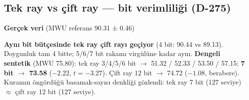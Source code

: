 \documentclass[11pt]{article}
\begin{document}
\subsection*{Tek ray vs çift ray — bit verimliliği (D-275)}
\textbf{Gerçek veri} (MWU referans 90.31 ± 0.46)
\begin{center}\small{}\end{center}
\textbf{Aynı bit bütçesinde tek ray çift rayı geçiyor} (4 bit: 90.44 vs 89.13). Doygunluk tam 4 bitte; 5/6/7 bit rakamı virgülüne kadar aynı.
\textbf{Dengeli sentetik} (MWU 75.80): tek ray 3/4/5/6 bit $\rightarrow$ 51.32 / 52.33 / 53.50 / 57.15; \textbf{7 bit $\rightarrow$ 73.58} ($-2.22$, $t{=}-3.27$). Çift ray 12 bit $\rightarrow$ 74.72 ($-1.08$, berabere). Kuramın öngördüğü basamak-sayısı denkliği gözlendi: tek ray 7 bit (127 seviye) $\approx$ çift ray 12 bit (127 seviye).
\end{document}
